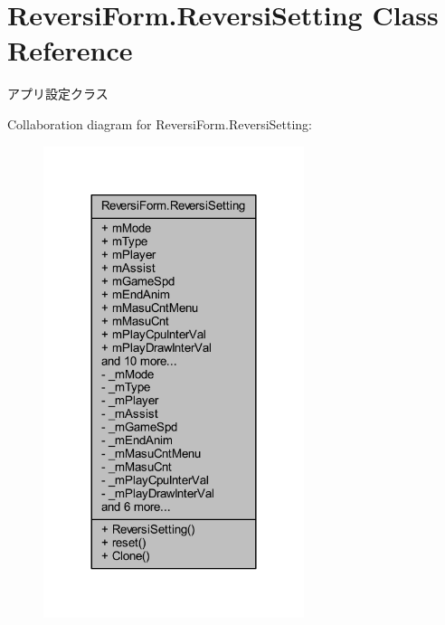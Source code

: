 \hypertarget{class_reversi_form_1_1_reversi_setting}{}\section{Reversi\+Form.\+Reversi\+Setting Class Reference}
\label{class_reversi_form_1_1_reversi_setting}


アプリ設定クラス  




Collaboration diagram for Reversi\+Form.\+Reversi\+Setting\+:
\nopagebreak
\begin{figure}[H]
\begin{center}
\leavevmode
\includegraphics[width=216pt]{class_reversi_form_1_1_reversi_setting__coll__graph}
\end{center}
\end{figure}
